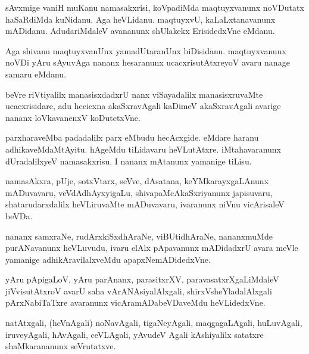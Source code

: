 \documentclass{article}
\begin{document}
\begin{mn}
sAvxmige  vaniH muKanu  namasakxrisi,  koVpadiMda  maqtuyxvanunx  noVDutatx  haSaRdiMda  kuNidanu.  Aga  heVLidanu.  
maqtuyxvU,  kaLaLxtanavanunx  mADidanu.  AdudariMdaleV  avananunx  shUlakekx  ErisidedxVne  eMdanu.
\end{mn}

\begin{mn}
Aga  shivanu  maqtuyxvanUnx  yamadUtaranUnx  biDisidanu.  maqtuyxvanunx  noVDi  yAru  sAyuvAga  nananx  hesaranunx  
ucacxrisutAtxreyoV  avaru  nanage  samaru  eMdanu.
\end{mn}

\begin{mn}
beVre  riVtiyalilx  manasisxdadxrU  nanx  viSayadalilx  manasisxruvaMte  ucacxrisidare,  adu  hecicxna  
akaSxravAgali  kaDimeV  akaSxravAgali  avarige  nananx  loVkavanenxV  koDutetxVne.
\end{mn}

\begin{mn}
parxharaveMba  padadalilx  parx  eMbudu  hecAcxgide.  eMdare  haranu  adhikaveMdaMtAyitu.  hAgeMdu  tiLidavaru  
heVLutAtxre.  iMtahavaranunx  dUradalilxyeV  namasakxrisu.  I  nananx  mAtanunx  yamanige  tiLisu.
\end{mn}

\begin{mn}
namasAkxra,  pUje,  sotxVtarx,  seVve,  dAsatana,  keYMkarayxgaLAnunx  mADuvavaru,  veVdAdhAyxyigaLu,  
shivapaMcAkaSxriyanunx  japisuvaru,  shatarudarxdalilx  heVLiruvaMte  mADuvavaru,  ivaranunx  niVnu  vicArisaleV  beVDa.
\end{mn}

\begin{mn}
nananx  samxraNe,  rudArxkiSxdhAraNe,  viBUtidhAraNe,  nananxmuMde  purANavanunx  heVLuvudu,  ivaru  elAlx  pApavanunx  
mADidadxrU  avara  meVle  yamanige  adhikAravilalxveMdu  apapxNemADidedxVne.
\end{mn}

\begin{mn}
yAru  pApigaLoV,  yAru  parAnanx,  parasitxrXV,  paravasatxrXgaLiMdaleV  jiVvisutAtxroV  avarU  saha  vArANAsiyalAlxgali,  
shirxVsheYladalAlxgali  pArxNabiTaTxre  avaranunx  vicAramADabeVDaveMdu  heVLidedxVne.
\end{mn}

\begin{mn}
natAtxgali,  (heVnAgali)  noNavAgali,  tigaNeyAgali,  maqgagaLAgali,  huLuvAgali,  iruveyAgali,  hAvAgali,  ceVLAgali,  
yAvudeV  Agali  kAshiyalilx  satatxre  shaMkarananunx  seVrutatxve.
\end{mn}
\end{document}
